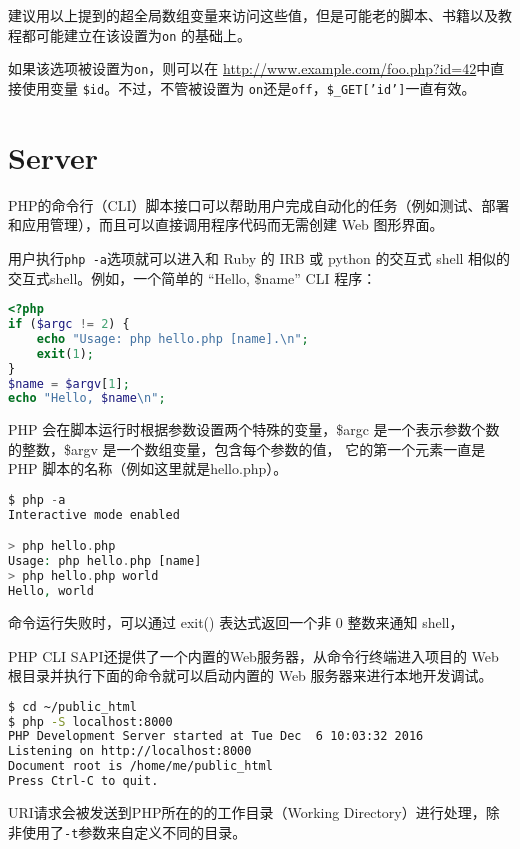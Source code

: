 建议用以上提到的超全局数组变量来访问这些值，但是可能老的脚本、书籍以及教程都可能建立在该设置为\texttt{on} 的基础上。

如果该选项被设置为\texttt{on}，则可以在 \url{http://www.example.com/foo.php?id=42}中直接使用变量 \texttt{\$id}。不过，不管被设置为 \texttt{on}还是\texttt{off}，\texttt{\$\_GET['id']}一直有效。






\section{Server}

PHP的命令行（CLI）脚本接口可以帮助用户完成自动化的任务（例如测试、部署和应用管理），而且可以直接调用程序代码而无需创建 Web 图形界面。

用户执行\texttt{php -a}选项就可以进入和 Ruby 的 IRB 或 python 的交互式 shell 相似的交互式shell。例如，一个简单的 “Hello, \$name” CLI 程序：


\begin{lstlisting}[language=PHP]
<?php
if ($argc != 2) {
    echo "Usage: php hello.php [name].\n";
    exit(1);
}
$name = $argv[1];
echo "Hello, $name\n";
\end{lstlisting}

PHP 会在脚本运行时根据参数设置两个特殊的变量，\$argc 是一个表示参数个数的整数，\$argv 是一个数组变量，包含每个参数的值， 它的第一个元素一直是 PHP 脚本的名称（例如这里就是hello.php）。

\begin{lstlisting}[language=PHP]
$ php -a
Interactive mode enabled

> php hello.php
Usage: php hello.php [name]
> php hello.php world
Hello, world
\end{lstlisting}

命令运行失败时，可以通过 exit() 表达式返回一个非 0 整数来通知 shell，

PHP CLI SAPI还提供了一个内置的Web服务器，从命令行终端进入项目的 Web 根目录并执行下面的命令就可以启动内置的 Web 服务器来进行本地开发调试。

\begin{lstlisting}[language=bash]
$ cd ~/public_html
$ php -S localhost:8000
PHP Development Server started at Tue Dec  6 10:03:32 2016
Listening on http://localhost:8000
Document root is /home/me/public_html
Press Ctrl-C to quit.
\end{lstlisting}

URI请求会被发送到PHP所在的的工作目录（Working Directory）进行处理，除非使用了\texttt{-t}参数来自定义不同的目录。

